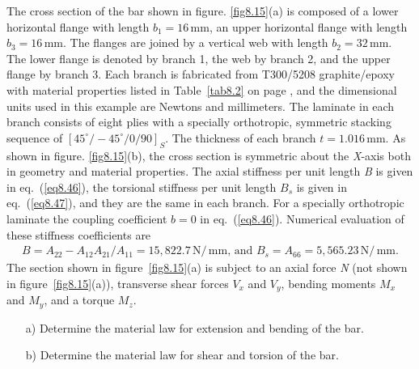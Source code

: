 \documentclass{AeroStructure-ERJohnson}
\begin{document}
\begin{example*}\label{ex8.5}The cross section of the bar shown in
figure. \ref{fig8.15}(a) is composed of a lower horizontal flange with
length ${b_{1}=16\,\mathrm{mm}}$, an upper horizontal flange with
length $b_{3}=16\,\mathrm{mm}$. The flanges are joined by a
vertical web\vadjust{\vspace*{3pt}\pagebreak} with length $b_{2}=32\,\mathrm{mm}$. The lower flange
is denoted by branch 1, the web by branch 2, and the upper flange
by branch 3. Each branch is fabricated from T300/5208
graphite/epoxy with material properties listed in Table~\ref{tab8.2} on
page \pageref{tab8.2}, and the dimensional units used in this example are
Newtons and millimeters. The laminate in each branch consists of
eight plies with a specially orthotropic, symmetric stacking
sequence of $\left[45^{\circ}/-45^{\circ}/ 0/ 90\right]_{S}$.
The thickness of each branch $t=1.016\,\mathrm{mm}$. As shown in
figure. \ref{fig8.15}(b), the cross section is symmetric about the
\textit{X}-axis both in geometry and material properties. The
axial stiffness per unit length \textit{B} is given in
eq.~(\ref{eq8.46}), the torsional stiffness per unit length
$B_{s}$ is given in eq.~(\ref{eq8.47}), and they are the same in
each branch. For a specially orthotropic laminate the coupling
coefficient $b = 0$ in eq.~(\ref{eq8.46}). Numerical evaluation of
these stiffness coefficients are
\begin{align*}
B=A_{22}-A_{12} A_{21}/ A_{11}=15,822.7\,\mathrm{N}/\,\mathrm{mm}\mbox{, and }B_{s}=A_{66}=5,565.23\,\mathrm{N}/\,\mathrm{mm}.
\end{align*}
The section shown in figure~\ref{fig8.15}(a) is subject to an axial force \textit{N} (not shown in figure~\ref{fig8.15}(a)), transverse shear forces $V_x$ and $V_y$, bending moments $M_x$ and $M_y$, and a torque $M_z$.
\begin{enumerate}[a)]
\item[a)] Determine the material law for extension and bending of the
bar.
\item[b)] Determine the material law for shear and torsion of the
bar.
\end{enumerate}

\end{example*}
\end{document}
